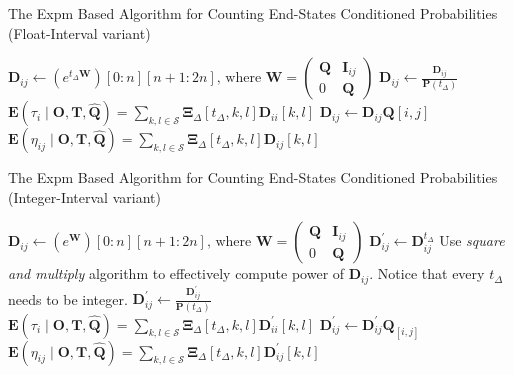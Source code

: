 \documentclass[thesis=M,english]{FITthesis}[2012/10/20]
\newcommand{\matr}[1]{\mathbf{#1}}
\begin{document}
\begin{algorithm}[h]
\caption{The Expm Based Algorithm for Counting End-States Conditioned Probabilities (Float-Interval variant)}\label{fv}
\begin{algorithmic}[1]
\ForAll{$t_{\Delta} \in \matr{T}_{\Delta}$}
	\State $\matr{D}_{ij} \gets (e^{t_{\Delta} \matr{W}}){[0:n][n+1:2n]}\text{, where } \matr{W} = \begin{pmatrix} \matr{Q} & \matr{I}_{ij} \\ 0 & \matr{Q} \end{pmatrix} $
	\State $\matr{D}_{ij} \gets \frac{ \matr{D}_{ij} }{\matr{P}({t_{\Delta}})}$ 
	 \State $\mathbf{E}(\tau_{i} \mid \matr{O}, \matr{T}, \matr{ \hat Q }) = \sum_{k,l \in \mathcal{S}} \matr{\Xi}_{\Delta}[t_{\Delta},k,l] \matr{D}_{ii}[k,l]$  
	\Else 
	 \State $\matr{D}_{ij} \gets  \matr{D}_{ij} \matr{Q}{[i,j]}$
	 \State $\mathbf{E}(\eta_{ij} \mid \matr{O}, \matr{T}, \matr{ \hat Q } ) = \sum_{k,l \in \mathcal{S}} \matr{\Xi}_{\Delta}[t_{\Delta},k,l] \matr{D}_{ij}[k,l]$ 
  	\EndIf 
 
 \EndFor
\EndFor
\EndProcedure
\end{algorithmic}
\end{algorithm}

\begin{algorithm}[h]
\caption{The Expm Based Algorithm for Counting End-States Conditioned Probabilities (Integer-Interval variant)}\label{iv}
\begin{algorithmic}[1]
	\State $\matr{D}_{ij} \gets (e^{\matr{W}})[0:n][n+1:2n]\text{, where } \matr{W} = \begin{pmatrix} \matr{Q} & \matr{I}_{ij} \\ 0 & \matr{Q} \end{pmatrix} $
 \EndFor
\ForAll{$t_{\Delta} \in \matr{T}_{\Delta}$}
    \State $\matr{D}_{ij}^{'} \gets  \matr{D}_{ij}^{t_{\Delta}} $
    \Comment Use \textit{square and multiply} algorithm to effectively compute	power of $\matr{D}_{ij}$. Notice that every $t_{\Delta}$ needs to be integer.
	\State $\matr{D}_{ij}^{'} \gets \frac{ \matr{D}_{ij}^{'} }{\matr{P}({t_{\Delta}})}$ 
	 \State $\mathbf{E}(\tau_{i} \mid \matr{O}, \matr{T}, \matr{ \hat Q }) = \sum_{k,l \in \mathcal{S}} \matr{\Xi}_{\Delta}[t_{\Delta},k,l] \matr{D}_{ii}^{'}[k,l]$  
	\Else 
	 \State $\matr{D}^{'}_{ij} \gets  \matr{D}_{ij}^{'} \matr{Q}_{[i,j]}$
	 \State $\mathbf{E}(\eta_{ij} \mid \matr{O}, \matr{T}, \matr{ \hat Q } ) = \sum_{k,l \in \mathcal{S}} \matr{\Xi}_{\Delta}[t_{\Delta},k,l] \matr{D}^{'}_{ij}[k,l]$ 
  	\EndIf 
  \EndFor
\EndFor
\EndProcedure
\end{algorithmic}
\end{algorithm}
\end{document}
